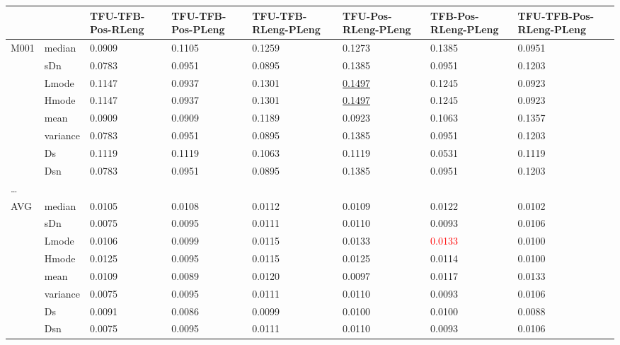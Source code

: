 \begin{tabular}{p{2cm}p{4cm}p{4cm}p{4cm}p{4cm}p{4cm}p{4cm}p{5cm}} 
\hline \hline

 & &  TFU-TFB-Pos-RLeng & TFU-TFB-Pos-PLeng & TFU-TFB-RLeng-PLeng & TFU-Pos-RLeng-PLeng & TFB-Pos-RLeng-PLeng & TFU-TFB-Pos-RLeng-PLeng\\
\hline
\multirow{8}{*}{M001} & median & 0.0909 & 0.1105 & 0.1259 & 0.1273 & 0.1385 & 0.0951\\
& sDn & 0.0783 & 0.0951 & 0.0895 & 0.1385 & 0.0951 & 0.1203\\
& Lmode & 0.1147 & 0.0937 & 0.1301 & \underline{0.1497} & 0.1245 & 0.0923\\
& Hmode & 0.1147 & 0.0937 & 0.1301 & \underline{0.1497} & 0.1245 & 0.0923\\
& mean & 0.0909 & 0.0909 & 0.1189 & 0.0923 & 0.1063 & 0.1357\\
& variance & 0.0783 & 0.0951 & 0.0895 & 0.1385 & 0.0951 & 0.1203\\
& Ds & 0.1119 & 0.1119 & 0.1063 & 0.1119 & 0.0531 & 0.1119\\
& Dsn & 0.0783 & 0.0951 & 0.0895 & 0.1385 & 0.0951 & 0.1203\\
\hline
\ldots &  &  &  &  &  & & \\
\hline 

\multirow{8}{*}{AVG} & median & 0.0105 & 0.0108 & 0.0112 & 0.0109 & 0.0122 & 0.0102\\
& sDn & 0.0075 & 0.0095 & 0.0111 & 0.0110 & 0.0093 & 0.0106\\
& Lmode & 0.0106 & 0.0099 & 0.0115 & 0.0133 & \textcolor{red}{0.0133} & 0.0100\\
& Hmode & 0.0125 & 0.0095 & 0.0115 & 0.0125 & 0.0114 & 0.0100\\
& mean & 0.0109 & 0.0089 & 0.0120 & 0.0097 & 0.0117 & 0.0133\\
& variance & 0.0075 & 0.0095 & 0.0111 & 0.0110 & 0.0093 & 0.0106\\
& Ds & 0.0091 & 0.0086 & 0.0099 & 0.0100 & 0.0100 & 0.0088\\
& Dsn & 0.0075 & 0.0095 & 0.0111 & 0.0110 & 0.0093 & 0.0106\\
\hline \hline
\end{tabular}
